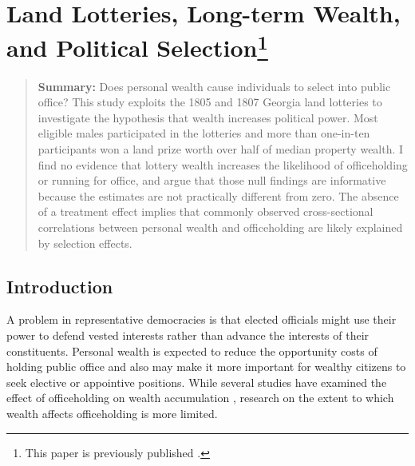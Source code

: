 \chapter[Land Lotteries, Long-term Wealth, and Political Selection]{Land Lotteries, Long-term Wealth, and Political Selection\footnote{This paper is previously published \citep{poulos2019land}.}}\label{ga-lottery}

\begin{quote}  
	\textbf{Summary:} Does personal wealth cause individuals to select into public office? This study exploits the 1805 and 1807 Georgia land lotteries to investigate the hypothesis that wealth increases political power. Most eligible males participated in the lotteries and more than one-in-ten participants won a land prize worth over half of median property wealth. I find no evidence that lottery wealth increases the likelihood of officeholding or running for office, and argue that those null findings are informative because the estimates are not practically different from zero. The absence of a treatment effect implies that commonly observed cross-sectional correlations between personal wealth and officeholding are likely explained by selection effects.
\end{quote}

\clearpage

\section{Introduction}

\noindent
A problem in representative democracies is that elected officials might use their power to defend vested interests rather than advance the interests of their constituents. Personal wealth is expected to reduce the opportunity costs of holding public office and also may make it more important for wealthy citizens to seek elective or appointive positions. While several studies have examined the effect of officeholding on wealth accumulation  \citep[e.g.,][]{eggers2009,querubin2013,truex2013}, research on the extent to which wealth affects officeholding is more limited. 

